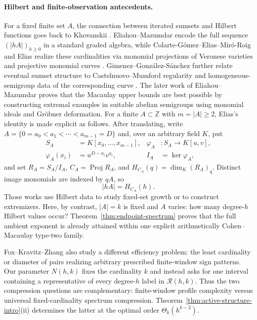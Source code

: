 \documentclass[11pt,reqno]{amsart}
\theoremstyle{definition}
\theoremstyle{remark}
\newcommand{\Rcal}{\mathcal R}
\begin{document}
\paragraph{Hilbert and finite-observation antecedents.}
For a fixed finite set $A$, the connection between iterated sumsets and
Hilbert functions goes back to Khovanskii
\cite{Khovanskii1992,Khovanskii1995}.  Eliahou--Mazumdar encode the full
sequence $(|hA|)_{h\geq0}$ in a standard graded algebra, while
Colarte-G\'omez--Elias--Mir\'o-Roig and Elias realize these cardinalities via
monomial projections of Veronese varieties and projective monomial curves
\cite{EliahouMazumdar2022,EliahouMazumdar2025,
ColarteGomezEliasMiroRoig2023,Elias2022}.  Gimenez--Gonz\'alez-S\'anchez
further relate eventual sumset structure to Castelnuovo--Mumford regularity
and homogeneous-semigroup data of the corresponding curve
\cite{GimenezGonzalezSanchez2023}.  The later work of
Eliahou--Mazumdar proves that the Macaulay upper bounds are best possible by
constructing extremal examples in suitable abelian semigroups using monomial
ideals and Gr\"obner deformation.  For a finite $A\subset\mathbb Z$ with
$m=|A|\geq2$, Elias's identity is made explicit as follows.  After translating, write
$A=\{0=a_0<a_1<\cdots<a_{m-1}=D\}$ and, over an arbitrary field $K$, put
\[
 \begin{aligned}
 S_A&=K[x_0,\ldots,x_{m-1}],&
 \varphi_A&:S_A\longrightarrow K[u,v],\\
 \varphi_A(x_i)&=u^{D-a_i}v^{a_i},&
 I_A&=\ker\varphi_A,
 \end{aligned}
\]
and set $R_A=S_A/I_A$, $C_A=\operatorname{Proj}R_A$, and
$H_{C_A}(q)=\dim_K(R_A)_q$.  Distinct image monomials are indexed by
$qA$, so
\begin{equation}\label{eq:eliasbridge}
 |hA|=H_{C_A}(h).
\end{equation}
Those works use Hilbert data to study fixed-set growth or to construct
extremizers.  Here, by contrast, $|A|=k$ is fixed and $A$ varies: how many
degree-$h$ Hilbert values occur?  Theorem~\ref{thm:endpoint-spectrum} proves
that the full ambient exponent is already attained within one explicit
arithmetically Cohen--Macaulay type-two family.

Fox--Kravitz--Zhang also study a different efficiency problem: the least
cardinality or diameter of pairs realizing arbitrary prescribed finite-window
sign patterns.  Our parameter $N(h,k)$ fixes the cardinality $k$ and instead
asks for one interval containing a representative of every degree-$h$ label in
$\Rcal(h,k)$.  Thus the two compression questions are complementary:
finite-window profile complexity versus universal fixed-cardinality spectrum
compression.  Theorem~\ref{thm:active-structure-intro}\textup{(ii)} determines
the latter at the optimal order $\Theta_k(h^{k-2})$.
\end{document}
